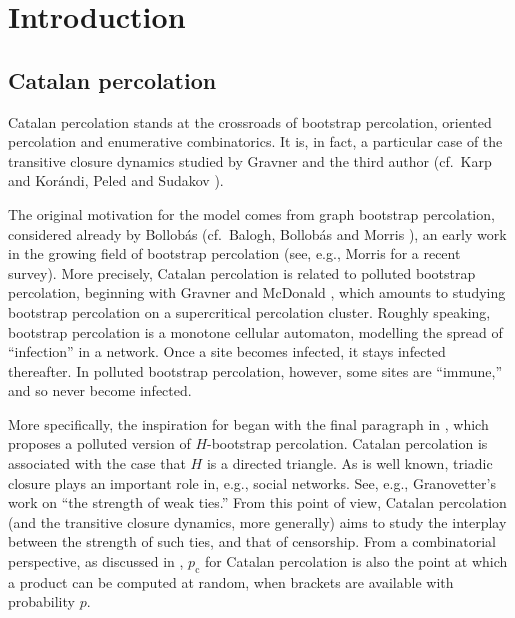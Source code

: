 \documentclass[pdflatex,sn-mathphys-num]{sn-jnl}%
\newcommand{\1}{{\ensuremath{\mathbf{1}}} }
\newcommand{\pc}{\ensuremath{p_{\mathrm{c}} }}
\theoremstyle{thmstyleone}%
\theoremstyle{thmstyletwo}%
\theoremstyle{thmstylethree}%
\begin{document}
\section{Introduction}
\label{sec:intro}










\subsection{Catalan percolation}
\label{subsubsec:Catalan:background}
Catalan percolation stands at the crossroads of 
bootstrap percolation,
oriented percolation and 
enumerative combinatorics.  
It is, in fact, a particular case of the transitive closure dynamics studied 
by Gravner and the third author \cite{Gravner23} (cf.\ Karp \cite{Karp90}
and Kor{\'a}ndi, Peled and Sudakov \cite{Korandi16}).

The original motivation for the model comes from graph bootstrap percolation, 
considered already by Bollob{\'a}s \cite{Bollobas68} (cf.\ 
Balogh, Bollob{\'a}s and Morris \cite{Balogh12b}), 
an early work in the growing field of bootstrap percolation (see, e.g., Morris \cite{Morris17a} for a recent survey). 
More precisely, Catalan percolation is related to 
polluted bootstrap percolation, beginning with    
Gravner and McDonald
\cite{Gravner97a}, 
which amounts to studying bootstrap percolation on a supercritical percolation cluster. 
Roughly speaking, bootstrap percolation is a monotone cellular automaton, modelling the 
spread of ``infection'' in a network. 
Once a site becomes infected, it stays infected thereafter. 
In polluted bootstrap 
percolation, however, some sites are ``immune,'' and so never become infected. 

More specifically, the inspiration for \cite{Gravner23} began with the 
final paragraph in \cite[p.\ 439]{Balogh12b}, which proposes
a polluted version of $H$-bootstrap percolation. Catalan percolation
is associated with the case that $H$ is a directed triangle. 
As is well known, triadic closure plays an important role in, e.g., social networks. 
See, e.g., Granovetter's \cite{Granovetter73} work on ``the strength of weak ties.''
From this point of view, 
Catalan percolation 
(and the transitive closure dynamics, more generally) 
aims to study 
the interplay between the strength of such ties, 
and that of censorship. 
From a combinatorial perspective, as discussed in \cite{Gravner23}, 
$\pc$ for Catalan percolation is also the
point at which a product can be computed at random, when 
brackets are available with probability $p$. 
\end{document}
